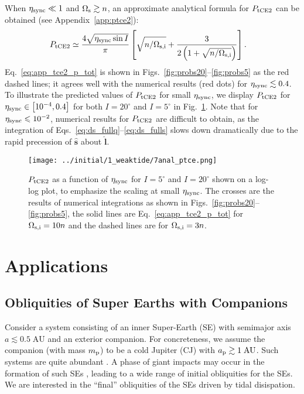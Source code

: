 \documentclass[
        fleqn,
        usenatbib,
        referee
    ]{mnras}
\newcommand*{\p}[1]{\left(#1\right)}
\newcommand*{\s}[1]{\left[#1\right]}
\newcommand*{\uv}[1]{\hat{\boldsymbol{\mathbf{#1}}}}
\newlength{\colummwidth}
\begin{document}
When $\eta_{\rm sync} \ll 1$ and $\Omega_{\rm s} \gtrsim n$, an approximate
analytical formula for $P_{\rm tCE2}$ can be obtained (see
Appendix~\ref{app:ptce2}):
\begin{align}
    P_{\rm tCE2} &\simeq
            \frac{4\sqrt{\eta _{\rm sync} \sin I}}{\pi}\s{
                \sqrt{n / \Omega_{\rm s, i}}
                + \frac{3}{2\p{1
                + \sqrt{n / \Omega_{\rm s, i}}}}}.\label{eq:app_tce2_p_tot}
\end{align}
Eq.~\eqref{eq:app_tce2_p_tot} is shown in
Figs.~\ref{fig:probs20}--\ref{fig:probs5} as the red dashed lines; it
agrees well with the numerical results (red dots) for $\eta_{\rm sync} \lesssim
0.4$. To illustrate the predicted values of $P_{\rm tCE2}$ for small $\eta_{\rm
sync}$, we display $P_{\rm tCE2}$ for $\eta_{\rm sync} \in \s{10^{-4}, 0.4}$ for
both $I = 20^\circ$ and $I = 5^\circ$ in Fig.~\ref{fig:anal_ptce}. Note that
for $\eta_{\rm sync} \leq 10^{-2}$, numerical results for $P_{\rm tCE2}$ are
difficult to obtain, as the integration of
Eqs.~\eqref{eq:ds_fullq}--\eqref{eq:ds_fulls} slows down dramatically due to the
rapid precession of $\uv{s}$ about $\uv{l}$.
\begin{figure}
    \centering
    \texttt{[image: ../initial/1\_weaktide/7anal\_ptce.png]}
    \caption{$P_{\rm tCE2}$ as a function of $\eta_{\rm sync}$ for $I = 5^\circ$
    and $I = 20^\circ$ shown on a log-log plot, to emphasize the scaling at
    small $\eta_{\rm sync}$. The crosses are the results of numerical
    integrations as shown in Figs.~\ref{fig:probs20}--\ref{fig:probs5}, the solid
    lines are Eq.~\eqref{eq:app_tce2_p_tot} for $\Omega_{\rm s, i} = 10n$ and
    the dashed lines are for $\Omega_{\rm s, i} = 3n$.}\label{fig:anal_ptce}
\end{figure}

\section{Applications}\label{s:applications}

\subsection{Obliquities of Super Earths with Companions
}\label{ss:disc_sehj}

Consider a system consisting of an inner Super-Earth (SE) with semimajor axis $a
\lesssim 0.5\;\mathrm{AU}$ and an exterior companion. For concreteness, we
assume the companion (with mass $m_{\rm p}$) to be a cold
Jupiter (CJ) with $a_{\rm p} \gtrsim 1\;\mathrm{AU}$. Such systems are quite
abundant \citep{zhu2018super}. A phase of giant impacts may occur in the
formation of such SEs \citep{inamdar2015formation, izidoro2017breaking}, leading
to a wide range of initial obliquities for the SEs. We are interested in the
``final'' obliquities of the SEs driven by tidal disispation.
\end{document}
